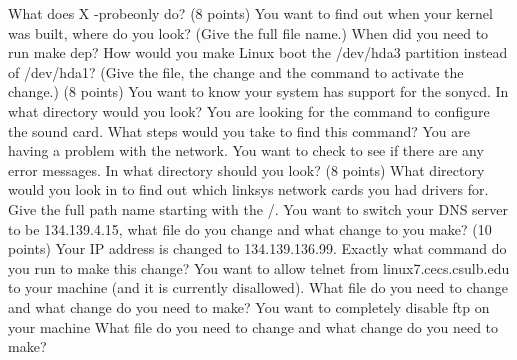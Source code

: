 What does {\ltt{}X -probeonly} do?
\vskip 0.8in
\ques
(8 points)
You want to find out when your kernel was built,
where do you look? (Give the full file name.)
\vskip 0.8in
When did you need to run {\ltt{}make dep}?
\vskip 0.8in
How would you make Linux boot the {\ltt{}/dev/hda3} partition
instead of {\ltt{}/dev/hda1}?
(Give the file, the change and the command to activate the change.)
\vfill\eject
\ques
(8 points)
You want to know your system has support for the sonycd.
In what directory would you look?
\vskip 0.4in
You are looking for the command to configure the sound card.
What steps would you take to find this command?
\vskip 1.0in
You are having a problem with the network. 
You want to check to see if there are any  error messages.
In what directory should you look?
\vskip 0.4in
\ques
(8 points)
What directory would you look in to find out which
linksys network cards you had drivers for.
Give the full path name starting with the {\ltt{}/}.
\vskip 0.5in
You want to switch your DNS server to be {\ltt{}134.139.4.15},
what file do you change and what change to you make?
\vskip 0.5in
\ques
(10 points)
Your IP address is changed to {\ltt{}134.139.136.99}.
Exactly what command do you run to make this change?
\vskip 1.0in
You want to allow telnet from {\ltt{}linux7.cecs.csulb.edu} to your machine
(and it is currently disallowed).
What file do you need to change and what change do you need to make?
\vskip 1.0in
You want to completely disable {\ltt{}ftp} on your machine
What file do you need to change and what change do you need to make?
\bye
